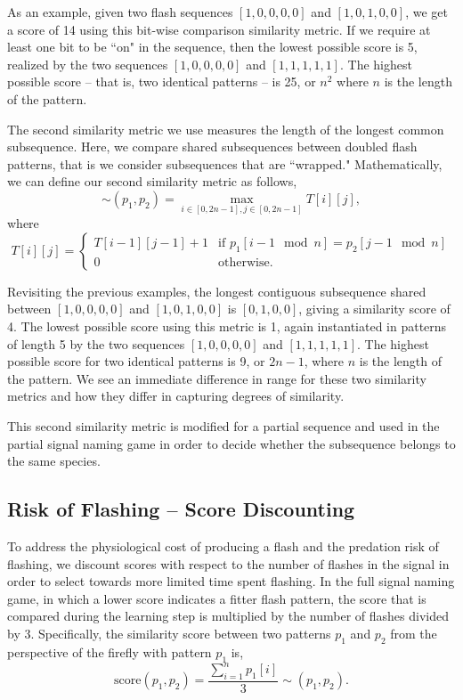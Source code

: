 As an example, given two flash sequences $[1,0,0,0,0]$ and $[1,0,1,0,0]$, we get a score of 14 using this bit-wise comparison similarity metric. 
If we require at least one bit to be ``on" in the sequence, then the lowest possible score is 5, realized by the two sequences $[1,0,0,0,0]$ and $[1,1,1,1,1]$. 
The highest possible score -- that is, two identical patterns -- is 25, or $n^2$ where $n$ is the length of the pattern. 

The second similarity metric we use measures the length of the longest common subsequence. Here, we compare shared subsequences between doubled flash patterns, that is we consider subsequences that are ``wrapped." 
 Mathematically, we can define our second similarity metric as follows,
\[ \sim (p_1, p_2) =  \max _{i \in [0,2n-1], j \in [0,2n-1]} T[i][j], \] 
where {\tiny \[ T[i][j] = \begin{cases} T[i-1][j-1] + 1 &\textrm{if } p_1[i-1 \mod n] = p_2[j-1 \mod n] \\
	0 &\textrm{otherwise.} \end{cases}\]}
	
Revisiting the previous examples, the longest contiguous subsequence shared between $[1,0,0,0,0]$ and $[1,0,1,0,0]$ is $[0,1,0,0]$, giving a similarity score of 4. 
The lowest possible score using this metric is 1, again instantiated in patterns of length 5 by the two sequences $[1,0,0,0,0]$ and $[1,1,1,1,1]$. 
The highest possible score for two identical patterns is 9, or $2n-1$, where $n$ is the length of the pattern. 
We see an immediate difference in range for these two similarity metrics and how they differ in capturing degrees of similarity. 

This second similarity metric is modified for a partial sequence and used in the partial signal naming game in order to decide whether the subsequence belongs to the same species. 

\subsection{Risk of Flashing -- Score Discounting}
To address the physiological cost of producing a flash and the predation risk of flashing, we discount scores with respect to the number of flashes in the signal in order to select towards more limited time spent flashing. 
In the full signal naming game, in which a lower score indicates a fitter flash pattern, the score that is compared during the learning step is multiplied by the number of flashes divided by 3. Specifically, the similarity score between two patterns $p_1$ and $p_2$ from the perspective of the firefly with pattern $p_1$ is, \[ \textrm{score}(p_1, p_2) = \frac{\sum_{i = 1}^{n} p_1[i]}{3} \sim(p_1, p_2).\]

